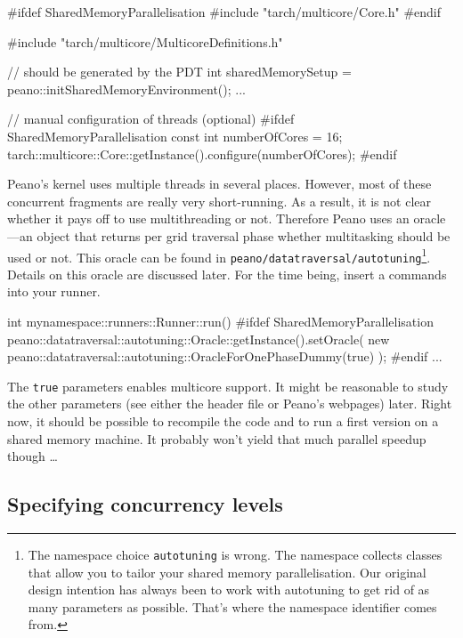 \begin{code}
#ifdef SharedMemoryParallelisation
#include "tarch/multicore/Core.h"
#endif

#include "tarch/multicore/MulticoreDefinitions.h"

  // should be generated by the PDT
  int sharedMemorySetup = peano::initSharedMemoryEnvironment();
  ...


  // manual configuration of threads (optional)
  #ifdef SharedMemoryParallelisation
  const int         numberOfCores    = 16;
  tarch::multicore::Core::getInstance().configure(numberOfCores);
  #endif

\end{code}

\noindent
Peano's kernel uses multiple threads in several places. 
However, most of these concurrent fragments are really very short-running.
As a result, it is not clear whether it pays off to use multithreading or not.
Therefore Peano uses an oracle---an object that returns per grid
traversal phase whether multitasking should be used or not.
This oracle can be found in \linebreak
\texttt{peano/datatraversal/autotuning}\footnote{The namespace choice
\texttt{autotuning} is wrong. The namespace collects classes that allow you to
tailor your shared memory parallelisation. Our original design intention has
always been to work with autotuning to get rid of as many parameters as
possible. That's where the namespace identifier comes from.}.
Details on this oracle are discussed later.
For the time being, insert a commands into your runner.

\label{page:shared_memory:dummy-oracle}
\begin{code}
int mynamespace::runners::Runner::run() {
  #ifdef SharedMemoryParallelisation
  peano::datatraversal::autotuning::Oracle::getInstance().setOracle(
    new peano::datatraversal::autotuning::OracleForOnePhaseDummy(true)
  );
  #endif
  ...
}
\end{code}

\noindent
The \texttt{true} parameters enables multicore support.
It might be reasonable to study the other parameters (see either the header
file or Peano's webpages) later.
Right now, it should be possible to recompile the code and to run a first
version on a shared memory machine.
It probably won't yield that much parallel speedup though \ldots


\subsection{Specifying concurrency levels}

